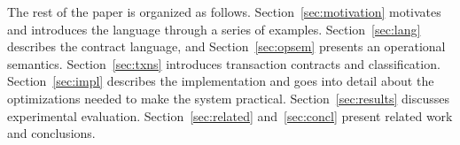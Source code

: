 The rest of the paper is organized as follows. Section~\ref{sec:motivation}
motivates \name and introduces the language through a series of examples.
Section~\ref{sec:lang} describes the contract language, and
Section~\ref{sec:opsem} presents an operational semantics.
Section~\ref{sec:txns} introduces transaction contracts and classification.
Section~\ref{sec:impl} describes the implementation and goes into detail about
the optimizations needed to make the system practical.
Section~\ref{sec:results} discusses experimental evaluation.
Section~\ref{sec:related} and~\ref{sec:concl} present related work and
conclusions.
